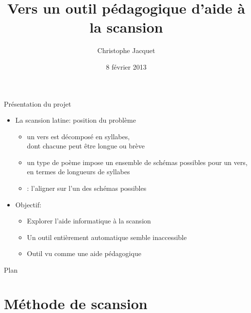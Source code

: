 \documentclass{beamer}
\title{Vers un outil pédagogique d'aide à la scansion}
\author{Christophe Jacquet}
\date{8 février 2013}
\begin{document}
\maketitle


\begin{frame}{Présentation du projet}

\begin{itemize}
\item La scansion latine: position du problème

\begin{itemize}
\item un vers est décomposé en syllabes,\\ dont chacune peut être longue ou brève
\item un type de poème impose un ensemble de schémas possibles pour un vers, en termes de longueurs de syllabes
\item {}: l'aligner sur l'un des schémas possibles
\end{itemize}

\vfill

\item Objectif:

\begin{itemize}
\item Explorer l'aide informatique à la scansion
\item Un outil entièrement automatique semble inaccessible
\item Outil vu comme une aide pédagogique
\end{itemize}

\end{itemize}

\end{frame} %


\begin{frame}{Plan}

\tableofcontents

\end{frame} %


\section{Méthode de scansion}
\end{document}

